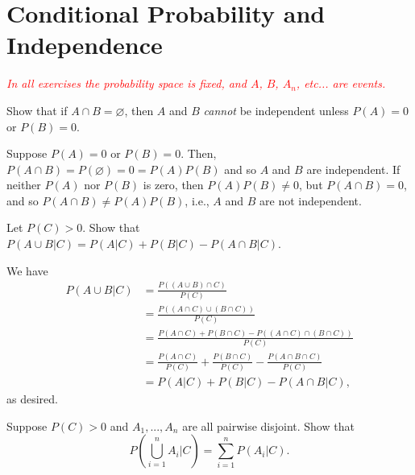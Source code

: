 \chapter{Conditional Probability and Independence}

\textcolor{red}{\textit{In all exercises the probability space is fixed, and $A$, $B$, $A_n$, etc... are events.}}

\begin{problem}
  Show that if $A \cap B = \varnothing$, then $A$ and $B$ \textit{cannot} be independent unless $P(A) = 0$ or $P(B) = 0$.
\end{problem}

\begin{solution}
  Suppose $P(A) = 0$ or $P(B) = 0$. Then, $P(A \cap B) = P(\varnothing) = 0 = P(A)P(B)$ and so $A$ and $B$ are independent. If neither $P(A)$ nor $P(B)$ is zero, then $P(A)P(B) \neq 0$, but $P(A \cap B) = 0$, and so $P(A \cap B) \neq P(A)P(B)$, i.e., $A$ and $B$ are not independent.
\end{solution}


\begin{problem}
  Let $P(C) > 0$. Show that $P(A \cup B | C) = P(A | C) + P (B | C) - P(A \cap B | C)$.
\end{problem}

\begin{solution}
  We have 
  \begin{align*}
  P(A \cup B | C) &= \frac{P((A \cup B) \cap C)}{P(C)} \\
  &= \frac{P((A \cap C) \cup (B \cap C))}{P(C)} \\
  &= \frac{P(A \cap C) + P(B \cap C) - P((A \cap C) \cap (B \cap C))}{P(C)} \\
  &= \frac{P(A \cap C)}{P(C)} + \frac{P(B \cap C)}{P(C)} - \frac{P(A \cap B \cap C)}{P(C)} \\
  &= P(A|C) + P(B|C) - P(A \cap B | C),
  \end{align*}
  as desired.
\end{solution}


\begin{problem}
  Suppose $P(C) > 0$ and $A_1, ..., A_n$ are all pairwise disjoint. Show that 
  \[ P\left( \bigcup_{i = 1}^n A_i | C \right) = \sum_{i = 1}^n P(A_i | C). \]
\end{problem}

